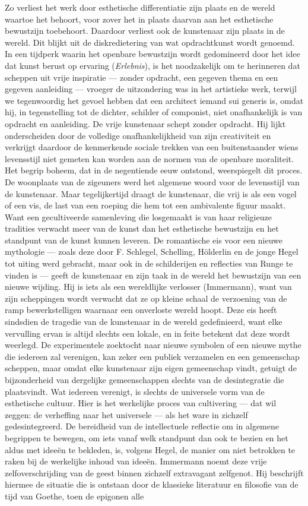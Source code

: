 Zo verliest het werk door esthetische differentiatie zijn plaats en de wereld waartoe het behoort, voor zover het in plaats daarvan aan het esthetische bewustzijn toebehoort. Daardoor verliest ook de kunstenaar zijn plaats in de wereld. Dit blijkt uit de diskredietering van wat opdrachtkunst wordt genoemd. In een tijdperk waarin het openbare bewustzijn wordt gedomineerd door het idee dat kunst berust op ervaring (\textit{Erlebnis}), is het noodzakelijk om te herinneren dat scheppen uit vrije inspiratie — zonder opdracht, een gegeven thema en een gegeven aanleiding — vroeger de uitzondering was in het artistieke werk, terwijl we tegenwoordig het gevoel hebben dat een architect iemand sui generis is, omdat hij, in tegenstelling tot de dichter, schilder of componist, niet onafhankelijk is van opdracht en aanleiding. De vrije kunstenaar schept zonder opdracht. Hij lijkt onderscheiden door de volledige onafhankelijkheid van zijn creativiteit en verkrijgt daardoor de kenmerkende sociale trekken van een buitenstaander wiens levensstijl niet gemeten kan worden aan de normen van de openbare moraliteit. Het begrip boheem, dat in de negentiende eeuw ontstond, weerspiegelt dit proces. De woonplaats van de zigeuners werd het algemene woord voor de levensstijl van de kunstenaar. Maar tegelijkertijd draagt de kunstenaar, die vrij is als een vogel of een vis, de last van een roeping die hem tot een ambivalente figuur maakt. Want een gecultiveerde samenleving die losgemaakt is van haar religieuze tradities verwacht meer van de kunst dan het esthetische bewustzijn en het standpunt van de kunst kunnen leveren. De romantische eis voor een nieuwe mythologie — zoals deze door F. Schlegel, Schelling, Hölderlin en de jonge Hegel tot uiting werd gebracht, maar ook in de schilderijen en reflecties van Runge te vinden is — geeft de kunstenaar en zijn taak in de wereld het bewustzijn van een nieuwe wijding. Hij is iets als een wereldlijke verlosser (Immermann), want van zijn scheppingen wordt verwacht dat ze op kleine schaal de verzoening van de ramp bewerkstelligen waarnaar een onverloste wereld hoopt. Deze eis heeft sindsdien de tragedie van de kunstenaar in de wereld gedefinieerd, want elke vervulling ervan is altijd slechts een lokale, en in feite betekent dat deze wordt weerlegd. De experimentele zoektocht naar nieuwe symbolen of een nieuwe mythe die iedereen zal verenigen, kan zeker een publiek verzamelen en een gemeenschap scheppen, maar omdat elke kunstenaar zijn eigen gemeenschap vindt, getuigt de bijzonderheid van dergelijke gemeenschappen slechts van de desintegratie die plaatsvindt. Wat iedereen verenigt, is slechts de universele vorm van de esthetische cultuur. Hier is het werkelijke proces van cultivering — dat wil zeggen: de verheffing naar het universele — als het ware in zichzelf gedesintegreerd. De bereidheid van de intellectuele reflectie om in algemene begrippen te bewegen, om iets vanaf welk standpunt dan ook te bezien en het aldus met ideeën te bekleden, is, volgens Hegel, de manier om niet betrokken te raken bij de werkelijke inhoud van ideeën. Immermann noemt deze vrije zelfoverschrijding van de geest binnen zichzelf extravagant zelfgenot. Hij beschrijft hiermee de situatie die is ontstaan door de klassieke literatuur en filosofie van de tijd van Goethe, toen de epigonen alle 